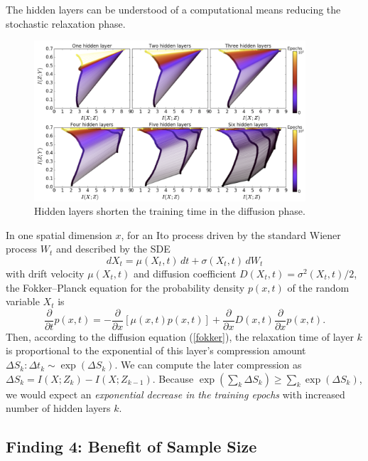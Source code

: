 \documentclass[11pt]{article}
\begin{document}
The hidden layers can be understood of a computational means reducing the stochastic relaxation phase.

\begin{figure}[H]
	\centering
	\includegraphics[width=0.9\textwidth]{layers}
	\caption{Hidden layers shorten the training time in the diffusion phase.}
\end{figure}

In one spatial dimension $x$, for an Ito process driven by the standard Wiener process $W_t$ and described by the SDE
\begin{equation}
dX_t = \mu(X_t, t) \,dt + \sigma(X_t, t) \,dW_t
\end{equation}
with drift velocity  $\mu(X_t, t)$ and diffusion coefficient $D(X_t, t) = \sigma^2(X_t, t)/2$, the Fokker–Planck equation for the probability density $p(x, t)$ of the random variable $X_t$ is
\begin{equation}
\frac{\partial}{\partial t} p(x, t) = -\frac{\partial}{\partial x}\left[\mu(x, t) p(x, t)\right] + \frac{\partial}{\partial x}D(x, t)\frac{\partial}{\partial x}p(x, t).
\label{fokker}
\end{equation}
Then, according to the diffusion equation (\ref{fokker}), the relaxation time of layer $k$ is proportional to the exponential of this layer's compression amount $\Delta S_k:\Delta t_k\sim \exp(\Delta S_k)$. We can compute the later compression as $\Delta S_k = I(X;Z_k)-I(X;Z_{k-1})$. Because $\exp(\sum_k \Delta S_k) \geq \sum_k \exp(\Delta S_k)$, we would expect an \emph{exponential decrease in the training epochs} with increased number of hidden layers $k$.

\subsection*{Finding 4: Benefit of Sample Size}
\end{document}
